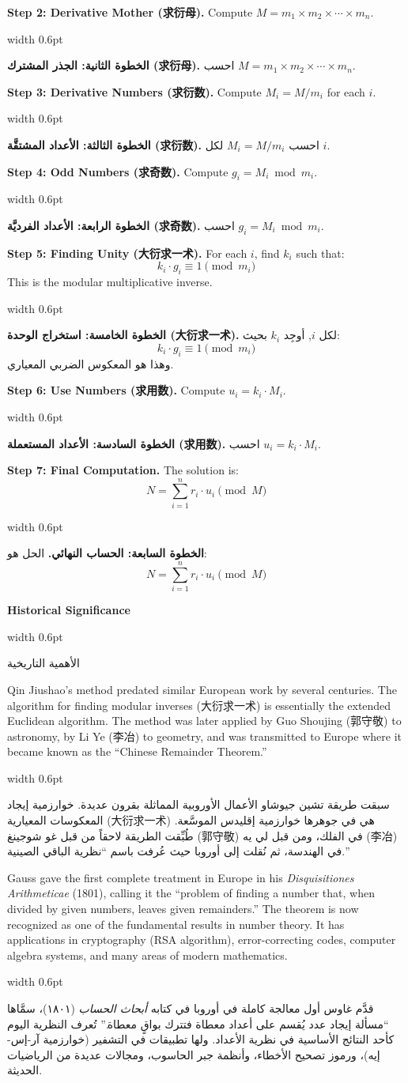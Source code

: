 \documentclass[11pt,a4paper]{article}
\newlength{\cnwidth}
\newlength{\arwidth}
\newcommand{\paralleltext}[2]{%
  \par\medskip\noindent
  \begin{minipage}[t]{\cnwidth}%
    \small #1%
  \end{minipage}%
  \hfill\textcolor{colrule}{\vrule width 0.6pt}\hfill
  \begin{minipage}[t]{\arwidth}%
    \small\arabicfont\beginR #2\endR%
  \end{minipage}%
  \par\medskip
}
\newcommand{\parallelsubsection}[2]{%
  \par\medskip\noindent
  \begin{minipage}[t]{\cnwidth}%
    \large\bfseries\color{sectioncolor} #1%
  \end{minipage}%
  \hfill\textcolor{colrule}{\vrule width 0.6pt}\hfill
  \begin{minipage}[t]{\arwidth}%
    \large\arabicfontbf\color{sectioncolor}\beginR #2\endR%
  \end{minipage}%
  \par\smallskip
}
\begin{document}
\paralleltext{%
\textbf{Step 2: Derivative Mother (求衍母).} Compute $M = m_1 \times m_2 \times \cdots \times m_n$.%
}{%
\textbf{الخطوة الثانية: الجذر المشترك (求衍母).} احسب $M = m_1 \times m_2 \times \cdots \times m_n$.
}

\paralleltext{%
\textbf{Step 3: Derivative Numbers (求衍数).} Compute $M_i = M / m_i$ for each $i$.%
}{%
\textbf{الخطوة الثالثة: الأعداد المشتقَّة (求衍数).} احسب $M_i = M / m_i$ لكل $i$.
}

\paralleltext{%
\textbf{Step 4: Odd Numbers (求奇数).} Compute $g_i = M_i \bmod m_i$.%
}{%
\textbf{الخطوة الرابعة: الأعداد الفرديَّة (求奇数).} احسب $g_i = M_i \bmod m_i$.
}

\paralleltext{%
\textbf{Step 5: Finding Unity (大衍求一术).} For each $i$, find $k_i$ such that:
\[k_i \cdot g_i \equiv 1 \pmod{m_i}\]
This is the modular multiplicative inverse.%
}{%
\textbf{الخطوة الخامسة: استخراج الوحدة (大衍求一术).} لكل $i$, أوجِد $k_i$ بحيث:
\[k_i \cdot g_i \equiv 1 \pmod{m_i}\]
وهذا هو المعكوس الضربي المعياري.
}

\paralleltext{%
\textbf{Step 6: Use Numbers (求用数).} Compute $u_i = k_i \cdot M_i$.%
}{%
\textbf{الخطوة السادسة: الأعداد المستعملة (求用数).} احسب $u_i = k_i \cdot M_i$.
}

\paralleltext{%
\textbf{Step 7: Final Computation.} The solution is:
\[N = \sum_{i=1}^{n} r_i \cdot u_i \pmod{M}\]%
}{%
\textbf{الخطوة السابعة: الحساب النهائي.} الحل هو:
\[N = \sum_{i=1}^{n} r_i \cdot u_i \pmod{M}\]
}

\parallelsubsection{Historical Significance}{الأهمية التاريخية}

\paralleltext{%
Qin Jiushao's method predated similar European work by several centuries. The algorithm for finding modular inverses (大衍求一术) is essentially the extended Euclidean algorithm. The method was later applied by Guo Shoujing (郭守敬) to astronomy, by Li Ye (李冶) to geometry, and was transmitted to Europe where it became known as the ``Chinese Remainder Theorem.''%
}{%
سبقت طريقة تشين جيوشاو الأعمال الأوروبية المماثلة بقرون عديدة. خوارزمية إيجاد المعكوسات المعيارية (大衍求一术) هي في جوهرها خوارزمية إقليدس الموسَّعة. طُبِّقت الطريقة لاحقاً من قبل غو شوجينغ (郭守敬) في الفلك، ومن قبل لي يه (李冶) في الهندسة، ثم نُقلت إلى أوروبا حيث عُرفت باسم ``نظرية الباقي الصينية.''
}

\paralleltext{%
Gauss gave the first complete treatment in Europe in his \textit{Disquisitiones Arithmeticae} (1801), calling it the ``problem of finding a number that, when divided by given numbers, leaves given remainders.'' The theorem is now recognized as one of the fundamental results in number theory. It has applications in cryptography (RSA algorithm), error-correcting codes, computer algebra systems, and many areas of modern mathematics.%
}{%
قدَّم غاوس أول معالجة كاملة في أوروبا في كتابه \textit{أبحاث الحساب} (١٨٠١)، سمَّاها ``مسألة إيجاد عدد يُقسم على أعداد معطاة فتترك بواقٍ معطاة.'' تُعرف النظرية اليوم كأحد النتائج الأساسية في نظرية الأعداد. ولها تطبيقات في التشفير (خوارزمية آر-إس-إيه)، ورموز تصحيح الأخطاء، وأنظمة جبر الحاسوب، ومجالات عديدة من الرياضيات الحديثة.
}
\end{document}
